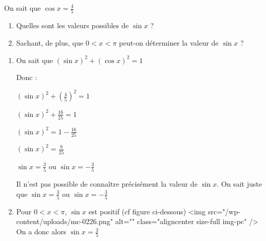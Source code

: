 
%
On sait que $\cos x = \frac{4}{5}$
\begin{enumerate}
     \item
     Quelles sont les valeurs possibles de $\sin x$ ?
     \item
     Sachant, de plus, que $0 < x < \pi $ peut-on déterminer la valeur de $\sin x$ ?
\end{enumerate}
\begin{corrige}
     \begin{enumerate}
          \item
          On sait que $\left(\sin x\right)^{2}+\left(\cos x\right)^{2}=1$
          \par
          Donc :
          \par
          $\left(\sin x\right)^{2}+\left(\frac{4}{5}\right)^{2}=1$
          \par
          $\left(\sin x\right)^{2}+\frac{16}{25}=1$
          \par
          $\left(\sin x\right)^{2}=1-\frac{16}{25}$
          \par
          $\left(\sin x\right)^{2}=\frac{9}{25}$
          \par
          $\sin x=\frac{3}{5}$ ou $\sin x=-\frac{3}{5}$
          \par
          Il n'est pas possible de connaître précisément la valeur de $\sin x$. On sait juste que $\sin x=\frac{3}{5}$ ou $\sin x=-\frac{3}{5}$
          \item
          Pour  $0 < x < \pi$, $\sin x$ est positif (cf figure ci-dessous)
          <img src="/wp-content/uploads/mc-0226.png" alt="" class="aligncenter size-full  img-pc" />
          On a donc alors $\sin x=\frac{3}{5}$
     \end{enumerate}
\end{corrige}
